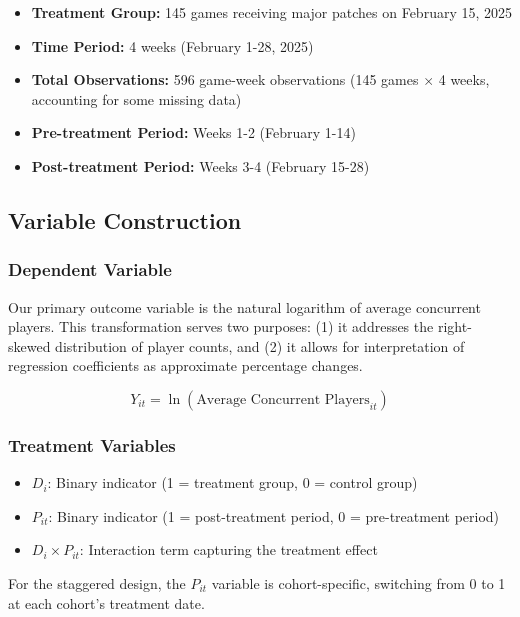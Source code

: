 \documentclass[12pt,a4paper]{article}
\begin{document}
\begin{itemize}
    \item \textbf{Treatment Group:} 145 games receiving major patches on February 15, 2025
    \item \textbf{Time Period:} 4 weeks (February 1-28, 2025)
    \item \textbf{Total Observations:} 596 game-week observations (145 games $\times$ 4 weeks, accounting for some missing data)
    \item \textbf{Pre-treatment Period:} Weeks 1-2 (February 1-14)
    \item \textbf{Post-treatment Period:} Weeks 3-4 (February 15-28)
\end{itemize}

\subsection{Variable Construction}

\subsubsection{Dependent Variable}

Our primary outcome variable is the natural logarithm of average concurrent players. This transformation serves two purposes: (1) it addresses the right-skewed distribution of player counts, and (2) it allows for interpretation of regression coefficients as approximate percentage changes.

\begin{equation}
Y_{it} = \ln(\text{Average Concurrent Players}_{it})
\end{equation}

\subsubsection{Treatment Variables}

\begin{itemize}
    \item $D_i$: Binary indicator (1 = treatment group, 0 = control group)
    \item $P_{it}$: Binary indicator (1 = post-treatment period, 0 = pre-treatment period)
    \item $D_i \times P_{it}$: Interaction term capturing the treatment effect
\end{itemize}

For the staggered design, the $P_{it}$ variable is cohort-specific, switching from 0 to 1 at each cohort's treatment date.
\end{document}
